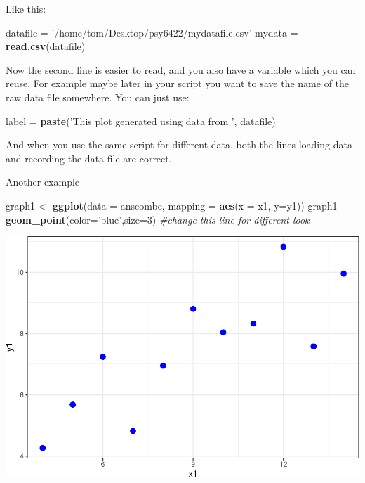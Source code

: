 \documentclass[]{book}
\newenvironment{Shaded}{\begin{snugshade}}{\end{snugshade}}
\newcommand{\KeywordTok}[1]{\textcolor[rgb]{0.13,0.29,0.53}{\textbf{#1}}}
\newcommand{\DataTypeTok}[1]{\textcolor[rgb]{0.13,0.29,0.53}{#1}}
\newcommand{\DecValTok}[1]{\textcolor[rgb]{0.00,0.00,0.81}{#1}}
\newcommand{\StringTok}[1]{\textcolor[rgb]{0.31,0.60,0.02}{#1}}
\newcommand{\CommentTok}[1]{\textcolor[rgb]{0.56,0.35,0.01}{\textit{#1}}}
\newcommand{\OperatorTok}[1]{\textcolor[rgb]{0.81,0.36,0.00}{\textbf{#1}}}
\newcommand{\NormalTok}[1]{#1}
\begin{document}
Like this:

\begin{Shaded}
\begin{Highlighting}[]
\NormalTok{datafile =}\StringTok{ '/home/tom/Desktop/psy6422/mydatafile.csv'}
\NormalTok{mydata =}\StringTok{ }\KeywordTok{read.csv}\NormalTok{(datafile)}
\end{Highlighting}
\end{Shaded}

Now the second line is easier to read, and you also have a variable
which you can reuse. For example maybe later in your script you want to
save the name of the raw data file somewhere. You can just use:

\begin{Shaded}
\begin{Highlighting}[]
\NormalTok{label =}\StringTok{ }\KeywordTok{paste}\NormalTok{(}\StringTok{'This plot generated using data from '}\NormalTok{, datafile)}
\end{Highlighting}
\end{Shaded}

And when you use the same script for different data, both the lines
loading data and recording the data file are correct.

Another example

\begin{Shaded}
\begin{Highlighting}[]
\NormalTok{graph1 <-}\StringTok{ }\KeywordTok{ggplot}\NormalTok{(}\DataTypeTok{data =}\NormalTok{ anscombe, }\DataTypeTok{mapping =} \KeywordTok{aes}\NormalTok{(}\DataTypeTok{x =}\NormalTok{ x1, }\DataTypeTok{y=}\NormalTok{y1))}
\NormalTok{graph1 }\OperatorTok{+}\StringTok{ }\KeywordTok{geom_point}\NormalTok{(}\DataTypeTok{color=}\StringTok{'blue'}\NormalTok{,}\DataTypeTok{size=}\DecValTok{3}\NormalTok{) }\CommentTok{#change this line for different look}
\end{Highlighting}
\end{Shaded}

\begin{center}\includegraphics[width=1\linewidth]{007-coding_files/figure-latex/unnamed-chunk-25-1} \end{center}
\end{document}

